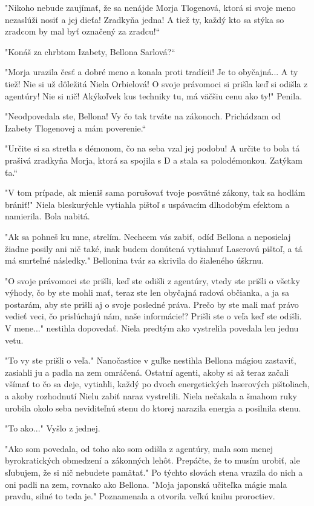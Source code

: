 \documentclass{book}
\begin{document}
"$ $Nikoho nebude zaujímať, že sa nenájde Morja Tlogenová, ktorá si svoje meno nezaslúži nosiť a jej dieťa! Zradkyňa jedna! A tiež ty, každý kto sa stýka so zradcom by mal byť označený za zradcu!“

"$ $Konáš za chrbtom Izabety, Bellona Sarlová?“

"$ $Morja urazila česť a dobré meno a konala proti tradícii! Je to obyčajná... A ty tiež! Nie si už dôležitá Niela Orbielová! O svoje právomoci si prišla keď si odišla z agentúry! Nie si nič! Akýkoľvek kus techniky tu, má väčšiu cenu ako ty!"$ $ Penila.

"$ $Neodpovedala ste, Bellona! Vy čo tak trváte na zákonoch. Prichádzam od Izabety Tlogenovej a mám poverenie.“

"$ $Určite si sa stretla s démonom, čo na seba vzal jej podobu! A určite to bola tá prašivá zradkyňa Morja, ktorá sa spojila s D a stala sa polodémonkou. Zatýkam ťa.“

"$ $V tom prípade, ak mieniš sama porušovať tvoje posvätné zákony, tak sa hodlám brániť!"$ $ Niela bleskurýchle vytiahla pištoľ s uspávacím dlhodobým efektom a namierila. Bola nabitá.

"$ $Ak sa pohneš ku mne, strelím. Nechcem vás zabiť, odíď Bellona a neposielaj žiadne posily ani nič také, inak budem donútená vytiahnuť Laserovú pištoľ, a tá má smrteľné následky."$ $ Bellonina tvár sa skrivila do šialeného úškrnu.

"$ $O svoje právomoci ste prišli, keď ste odišli z agentúry, vtedy ste prišli o všetky výhody, čo by ste mohli mať, teraz ste len obyčajná radová občianka, a ja sa postarám, aby ste prišli aj o svoje posledné práva. Prečo by ste mali mať právo vedieť veci, čo prislúchajú nám, naše informácie!? Prišli ste o veľa keď ste odišli. V mene..."$ $ nestihla dopovedať. Niela predtým ako vystrelila povedala len jednu vetu.

"$ $To vy ste prišli o veľa."$ $ Nanočastice v guľke nestihla Bellona mágiou zastaviť, zasiahli ju a padla na zem omráčená. Ostatní agenti, akoby si až teraz začali všímať to čo sa deje, vytiahli, každý po dvoch energetických laserových pištoliach, a akoby rozhodnutí Nielu zabiť naraz vystrelili. Niela nečakala a šmahom ruky urobila okolo seba neviditeľnú stenu do ktorej narazila energia a posilnila stenu.

"$ $To ako..."$ $ Vyšlo z jednej.

"$ $Ako som povedala, od toho ako som odišla z agentúry, mala som menej byrokratických obmedzení a zákonných lehôt. Prepáčte, že to musím urobiť, ale sľubujem, že si nič nebudete pamätať."$ $ Po týchto slovách stena vrazila do nich a oni padli na zem, rovnako ako Bellona. "$ $Moja japonská učiteľka mágie mala pravdu, silné to teda je."$ $ Poznamenala a otvorila veľkú knihu proroctiev.
\end{document}
